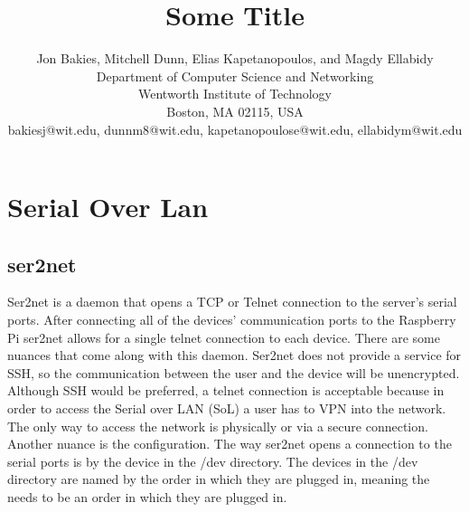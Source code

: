\documentclass[12pt]{IEEEtran}
\begin{document}
\title{Some Title}
\author{
Jon Bakies, Mitchell Dunn, Elias Kapetanopoulos, and Magdy Ellabidy \\
Department of Computer Science and Networking \\
Wentworth Institute of Technology \\
Boston, MA 02115, USA \\
bakiesj@wit.edu, dunnm8@wit.edu, kapetanopoulose@wit.edu, ellabidym@wit.edu
} 

\maketitle
\newpage
\clearpage

\section{Serial Over Lan}
\subsection{ser2net}
Ser2net is a daemon that opens a TCP or Telnet connection to the server's serial ports.
After connecting all of the devices' communication ports to the Raspberry Pi ser2net allows for a single telnet connection to each device.
There are some nuances that come along with this daemon.
Ser2net does not provide a service for SSH, so the communication between the user and the device will be unencrypted.
Although SSH would be preferred, a telnet connection is acceptable because in order to access the Serial over LAN (SoL) a user has to VPN into the network.
The only way to access the network is physically or via a secure connection.
Another nuance is the configuration.
The way ser2net opens a connection to the serial ports is by the device in the /dev directory.
The devices in the /dev directory are named by the order in which they are plugged in, meaning the needs to be an order in which they are plugged in.
\end{document}
